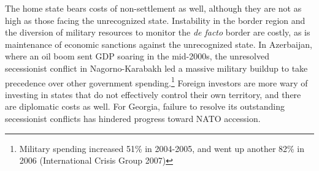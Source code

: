 \documentclass[11pt,letterpaper, notitlepage]{article}
\begin{document}
The home state bears costs of non-settlement as well, although they are not as high as those facing the unrecognized state. Instability in the border region and the diversion of military resources to monitor the \textit{de facto} border are costly, as is maintenance of economic sanctions against the unrecognized state. In Azerbaijan, where an oil boom sent GDP soaring in the mid-2000s, the unresolved secessionist conflict in Nagorno-Karabakh led a massive military buildup to take precedence over other government spending.\footnote{Military spending increased 51\% in 2004-2005, and went up another 82\% in 2006 (International Crisis Group 2007)} Foreign investors are more wary of investing in states that do not effectively control their own territory, and there are diplomatic costs as well. For Georgia, failure to resolve its outstanding secessionist conflicts has hindered progress toward NATO accession.






\end{document}
